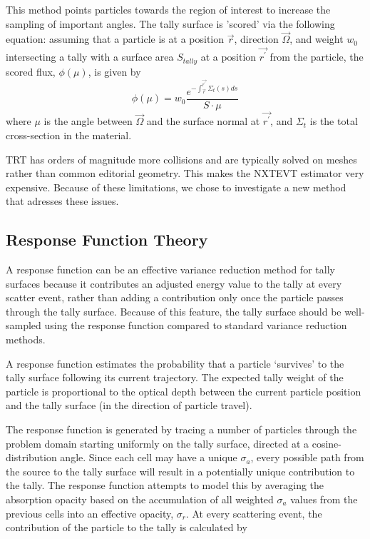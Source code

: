 This method points particles towards the region of interest to increase the sampling of important angles. The tally surface is 'scored' via the following equation: assuming that a particle is at a position $\vec{r}$, direction $\vec{\Omega}$, and weight $w_{0}$ intersecting a tally with a surface area $S_{tally}$ at a position $\vec{r^{\prime}}$ from the particle, the scored flux, $\phi(\mu)$, is given by
\begin{equation}
\phi(\mu) = w_{0} \frac{e^{-\int_{\vec{r}}^{\vec{r^{\prime}}} \Sigma_{t}(s)ds}}{S \cdot \mu}
\end{equation}
where $\mu$ is the angle between $\vec{\Omega}$ and the surface normal at $\vec{r^{\prime}}$, and $\Sigma_{t}$ is the total cross-section in the material. 

TRT has orders of magnitude more collisions and are typically solved on meshes rather than common editorial geometry. This makes the NXTEVT estimator very expensive. Because of these limitations, we chose to investigate a new method that adresses these issues. 

\subsection{Response Function Theory}
A response function can be an effective variance reduction method for tally surfaces because it contributes an adjusted energy value to the tally at every scatter event, rather than adding a contribution only once the particle passes through the tally surface. Because of this feature, the tally surface should be well-sampled using the response function compared to standard variance reduction methods. 

A response function estimates the probability that a particle `survives' to the tally surface following its current trajectory. The expected tally weight of the particle is proportional to the optical depth between the current particle position and the tally surface (in the direction of particle travel).

The response function is generated by tracing a number of particles through the problem domain starting uniformly on the tally surface, directed at a cosine-distribution angle. Since each cell may have a unique $\sigma_{a}$, every possible path from the source to the tally surface will result in a potentially unique contribution to the tally. The response function attempts to model this by averaging the absorption opacity based on the accumulation of all weighted $\sigma_{a}$ values from the previous cells into an effective opacity, $\sigma_{r}$. At every scattering event, the contribution of the particle to the tally is calculated by

